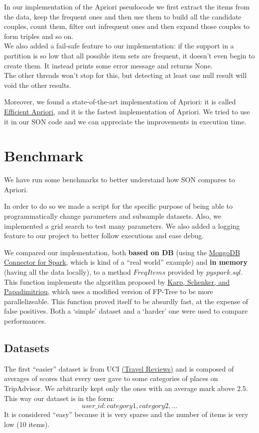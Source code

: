 \documentclass[a4paper]{article}
\begin{document}
    In our implementation of the Apriori pseudocode we first extract the items from the data, keep the frequent ones and then use them to build all the candidate couples, count them, filter out infrequent ones and then expand those couples to form triples and so on.\\
    We also added a fail-safe feature to our implementation: if the support in a partition is so low that all possible item sets are frequent, it doesn't even begin to create them. It instead prints some error message and returns None.\\
	The other threads won't stop for this, but detecting at least one null result will void the other results.

    Moreover, we found a state-of-the-art implementation of Apriori: it is called \href{https://github.com/tommyod/Efficient-Apriori}{Efficient Apriori}, and it is the fastest implementation of Apriori. We tried to use it in our SON code and we can appreciate the improvements in execution time.
	
	\section{Benchmark}
	We have run some benchmarks to better understand how SON compares to Apriori.
	
	In order to do so we made a script for the specific purpose of being able to programmatically change parameters and 	subsample datasets.
	Also, we implemented a grid search to test many parameters. We also added a logging feature to our project to better follow executions and ease debug.
	
	We compared our implementation, both \textbf{based on DB} (using the \href{https://www.mongodb.com/docs/spark-connector/current/}{MongoDB Connector for Spark}, which is kind of a ``real world'' example) and \textbf{in memory} (having all the data locally), to a method $FreqItems$ provided by $pyspark.sql$. 
	This function implements the algorithm proposed by \href{https://doi.org/10.1145/762471.762473}{Karp, Schenker, and Papadimitriou}, which uses a modified version of FP-Tree to be more parallelizeable. This function proved itself to be absurdly fast, at the expense of false positives.
	Both a  `simple' dataset and a `harder' one were used to compare performances.

	\subsection{Datasets}
	The first ``easier'' dataset is from UCI \href{https://archive.ics.uci.edu/ml/datasets/Travel+Reviews#}{(Travel Reviews)} and is composed of averages of scores that every user gave to some
	categories of places on TripAdvisor. We arbitrarily kept only the ones with an average mark above 2.5. This way our dataset is in the form:
	\[ user\_id: category1, category2, \ldots \]
	It is considered ``easy'' because it is very sparse and the number of items is very low (10 items).
\end{document}
